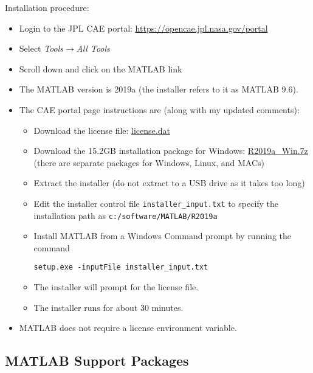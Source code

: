 \documentclass[10pt,twoside]{article}
\begin{document}
Installation procedure:
%
\begin{itemize}
\item Login to the JPL CAE portal:
\href{https://opencae.jpl.nasa.gov/portal}{https://opencae.jpl.nasa.gov/portal}
\item Select \emph{Tools}$\rightarrow$\emph{All Tools}
\item Scroll down and click on the MATLAB link
\item The MATLAB version is 2019a (the installer refers to it as MATLAB 9.6).
\item The CAE portal page instructions are (along with my updated comments):
\begin{itemize}
\item Download the license file:
\href{https://cae-artifactory.jpl.nasa.gov/artifactory/list/cae-tools-public/com/ECAE/MATLAB/license.dat}{license.dat}
\item Download the 15.2GB installation package for Windows:
\href{https://cae-artifactory.jpl.nasa.gov/artifactory/list/cae-tools-public/com/ECAE/MATLAB/2019/R2019a_Win.7z}{R2019a\_Win.7z}
\newline(there are separate packages
for Windows, Linux, and MACs)
\item Extract the installer (do not extract to a USB drive as it takes too long)
\item Edit the installer control file \verb+installer_input.txt+ to
specify the installation path as \verb+c:/software/MATLAB/R2019a+
\item Install MATLAB from a Windows Command prompt by running the command

\verb+setup.exe -inputFile installer_input.txt+
\item The installer will prompt for the license file.
\item The installer runs for about 30 minutes.
\end{itemize}

\item MATLAB does not require a license environment variable.
\end{itemize}

\clearpage
\subsection{MATLAB Support Packages}
\end{document}
